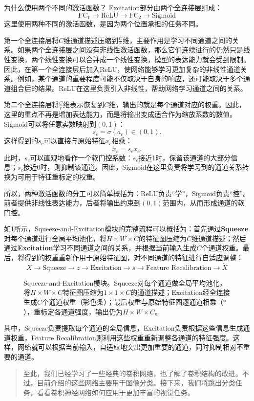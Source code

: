 \begin{orangeBox}{为什么使用两个不同的激活函数？}
Excitation部分由两个全连接层组成：
$$
\text{FC}_1\rightarrow\text{ReLU}\rightarrow\text{FC}_2\rightarrow\text{Sigmoid}
$$
这里使用两种不同的激活函数，是因为两个位置承担的任务不同。

第一个全连接层将$C$维通道描述压缩到$\frac{C}{r}$维，主要作用是学习不同通道之间的关系。如果两个全连接层之间没有非线性激活函数，那么它们连续进行的仍然只是线性变换，两个线性变换可以合并成一个线性变换，模型的表达能力就会受到限制。因此，在第一个全连接层后加入ReLU，使网络能够学习更加复杂的非线性通道关系。例如，某个通道的重要程度可能不仅取决于自身的响应，还可能取决于多个通道组合后的结果。ReLU在这里负责引入非线性，帮助网络学习通道之间的关系。

第二个全连接层将$\frac{C}{r}$维表示恢复到$C$维，输出的就是每个通道对应的权重。因此，这里的重点不再是增加表达能力，而是将输出变成适合作为缩放系数的数值。Sigmoid可以将任意实数映射到$(0,1)$：
$$
s_c=\sigma(a_c)\in(0,1).
$$
这样得到的$s_c$可以直接与原始特征$x_c$相乘：
$$
\widetilde{x}_c=s_cx_c.
$$
此时，$s_c$可以直观地看作一个软门控系数：$s_c$接近1时，保留该通道的大部分信息；$s_c$接近0时，则抑制该通道。因此，Sigmoid在这里负责将学习到的通道关系转换为可用于特征重标定的权重。

所以，两种激活函数的分工可以简单概括为：ReLU负责“学”，Sigmoid负责“控”。前者提供非线性表达能力，后者将输出约束到$(0,1)$范围内，从而形成通道的软门控。
\end{orangeBox}

如\cref{fig:se}所示，Squeeze-and-Excitation模块的完整流程可以概括为：首先通过\textbf{Squeeze}对每个通道进行全局平均池化，将$H\times W\times C$的特征图压缩为$C$维通道描述；然后通过\textbf{Excitation}学习不同通道之间的关系，并根据当前输入生成$C$个通道权重。最后，将得到的权重重新作用于原始特征图，对不同通道的特征进行自适应调整：
$$
X\rightarrow\text{Squeeze}\rightarrow z\rightarrow\text{Excitation}\rightarrow s\rightarrow\text{Feature Recalibration}\rightarrow\widetilde{X}
$$

\begin{figure}[H]
    \caption{Squeeze-and-Excitation模块。Squeeze对每个通道做全局平均池化，将$H\times W\times C$特征图压缩为$1\times 1\times C$的通道描述；Excitation经全连接生成$C$个通道权重（彩色条）；最后权重与原始特征图逐通道相乘（$\ast$），重标定各通道强度，输出仍为$H\times W\times C$。}
    \label{fig:se}
\end{figure}

其中，Squeeze负责提取每个通道的全局信息，Excitation负责根据这些信息生成通道权重，Feature Recalibration则利用这些权重重新调整各通道的特征强度。这样，网络就可以根据当前输入，自适应地突出更加重要的通道，同时抑制相对不重要的通道。

\begin{quote}
    至此，我们已经学习了一些经典的卷积网络，也了解了卷积结构的改进。不过，目前介绍的这些网络主要用于图像分类。接下来，我们将跳出分类任务，看看卷积神经网络如何应用于更加丰富的视觉任务。
\end{quote}